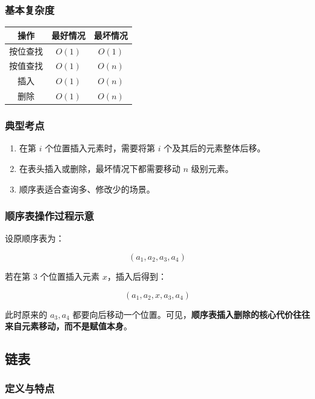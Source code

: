 \documentclass{../../note}
\begin{document}
\subsubsection{基本复杂度}

\begin{center}
\begin{tabular}{|c|c|c|}
\hline
操作 & 最好情况 & 最坏情况 \\
\hline
按位查找 & $O(1)$ & $O(1)$ \\
\hline
按值查找 & $O(1)$ & $O(n)$ \\
\hline
插入 & $O(1)$ & $O(n)$ \\
\hline
删除 & $O(1)$ & $O(n)$ \\
\hline
\end{tabular}
\end{center}

\subsubsection{典型考点}

\begin{enumerate}
  \item 在第 $i$ 个位置插入元素时，需要将第 $i$ 个及其后的元素整体后移。
  \item 在表头插入或删除，最坏情况下都需要移动 $n$ 级别元素。
  \item 顺序表适合查询多、修改少的场景。
\end{enumerate}

\subsubsection{顺序表操作过程示意}

设原顺序表为：

\[
(a_1, a_2, a_3, a_4)
\]

若在第 3 个位置插入元素 $x$，插入后得到：

\[
(a_1, a_2, x, a_3, a_4)
\]

此时原来的 $a_3, a_4$ 都要向后移动一个位置。可见，\textbf{顺序表插入删除的核心代价往往来自元素移动，而不是赋值本身}。

\subsection{链表}

\subsubsection{定义与特点}
\end{document}
